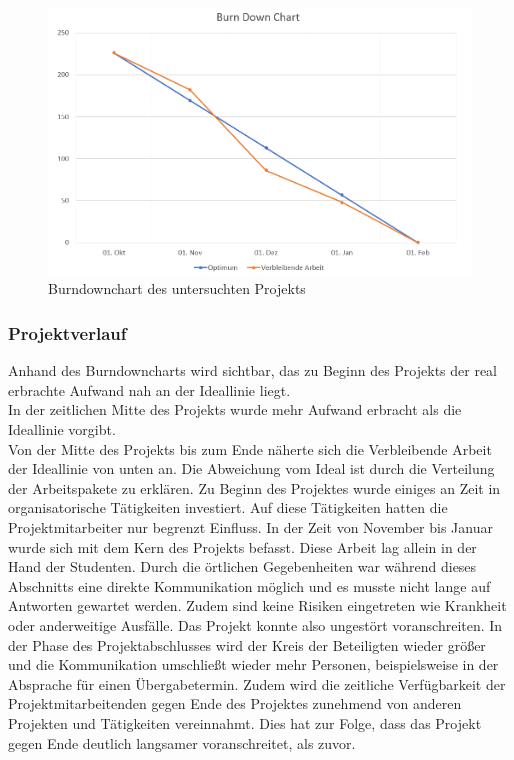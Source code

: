 \documentclass[ThesisDJ.tex]{subfiles}
\begin{document}
\begin{figure}
    \centering
    \includegraphics[width=\linewidth]{burnDownChart.png}
    \caption{Burndownchart des untersuchten Projekts}
    \label{fig:realburndown}
\end{figure}

\subsubsection{Projektverlauf}

Anhand des Burndowncharts wird sichtbar, das zu Beginn des Projekts der real erbrachte Aufwand nah an der Ideallinie liegt.\\
In der zeitlichen Mitte des Projekts wurde mehr Aufwand erbracht als die Ideallinie vorgibt.\\
Von der Mitte des Projekts bis zum Ende näherte sich die Verbleibende Arbeit der Ideallinie von unten an.
Die Abweichung vom Ideal ist durch die Verteilung der Arbeitspakete zu erklären. Zu Beginn des Projektes wurde einiges an Zeit in organisatorische Tätigkeiten investiert. Auf diese Tätigkeiten hatten die Projektmitarbeiter nur begrenzt Einfluss. In der Zeit von November bis Januar wurde sich mit dem Kern des Projekts befasst. Diese Arbeit lag allein in der Hand der Studenten. Durch die örtlichen Gegebenheiten war während dieses Abschnitts eine direkte Kommunikation möglich und es musste nicht lange auf Antworten gewartet werden. Zudem sind keine Risiken eingetreten wie Krankheit oder anderweitige Ausfälle. Das Projekt konnte also ungestört voranschreiten. 
In der Phase des Projektabschlusses wird der Kreis der Beteiligten wieder größer und die Kommunikation umschließt wieder mehr Personen, beispielsweise in der Absprache für einen Übergabetermin. Zudem wird die zeitliche Verfügbarkeit der Projektmitarbeitenden gegen Ende des Projektes zunehmend von anderen Projekten und Tätigkeiten vereinnahmt. Dies hat zur Folge, dass das Projekt gegen Ende deutlich langsamer voranschreitet, als zuvor.
\end{document}
